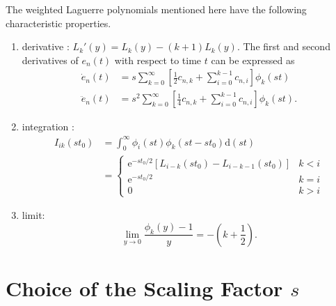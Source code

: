 \documentclass[conference, a4paper]{IEEEtran}
\begin{document}
The weighted Laguerre polynomials mentioned here have the following
characteristic properties.
\begin{enumerate}
\item derivative \cite{jung:time:2003}: $L_k'(y)=L_k(y)-(k+1)L_k(y)$. The first and second
derivatives of $e_n(t)$ with respect to time $t$ can be expressed as
\begin{equation}
\begin{split}
\dot{e}_n(t)&=s\sum _{k=0}^{\infty}\left [\frac{1}{2}c_{n,k}+\sum
_{i=0}^{k-1}c_{n,i}\right ]\phi _k(st) \\
\ddot{e}_n(t)&=s^2\sum _{k=0}^{\infty}\left [\frac{1}{4}c_{n,k}+\sum
_{i=0}^{k-1}c_{n,i}\right ]\phi _k(st).
\end{split}
\end{equation}
\item integration \cite{gradshteyn:table:1980}:
\begin{equation}
\begin{split}
I_{ik}(st_0)&=\int
_0^{\infty}\phi_i(st)\phi_k(st-st_0)\mathrm{d}(st) \\
&=\begin{cases}\mathrm{e}^{-st_0/2}[L_{i-k}(st_0)-L_{i-k-1}(st_0)]&k<i\\
    \mathrm{e}^{-st_0/2}&k=i\\
    0&k>i\end{cases}
\end{split}
\end{equation}
\item limit: 
\begin{equation}
\lim _{y\rightarrow 0}\frac{\phi_k(y)-1}{y}=-(k+\frac{1}{2}).
\end{equation}
\end{enumerate}

\section{Choice of the Scaling Factor $s$}
\end{document}
